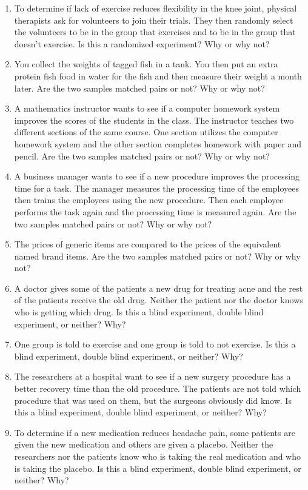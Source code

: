 \documentclass[
]{book}
\begin{document}
\begin{enumerate}
\item
  To determine if lack of exercise reduces flexibility in the knee joint, physical therapists ask for volunteers to join their trials. They then randomly select the volunteers to be in the group that exercises and to be in the group that doesn't exercise. Is this a randomized experiment? Why or why not?
\item
  You collect the weights of tagged fish in a tank. You then put an extra protein fish food in water for the fish and then measure their weight a month later. Are the two samples matched pairs or not? Why or why not?
\item
  A mathematics instructor wants to see if a computer homework system improves the scores of the students in the class. The instructor teaches two different sections of the same course. One section utilizes the computer homework system and the other section completes homework with paper and pencil. Are the two samples matched pairs or not? Why or why not?
\item
  A business manager wants to see if a new procedure improves the processing time for a task. The manager measures the processing time of the employees then trains the employees using the new procedure. Then each employee performs the task again and the processing time is measured again. Are the two samples matched pairs or not? Why or why not?
\item
  The prices of generic items are compared to the prices of the equivalent named brand items. Are the two samples matched pairs or not? Why or why not?
\item
  A doctor gives some of the patients a new drug for treating acne and the rest of the patients receive the old drug. Neither the patient nor the doctor knows who is getting which drug. Is this a blind experiment, double blind experiment, or neither? Why?
\item
  One group is told to exercise and one group is told to not exercise. Is this a blind experiment, double blind experiment, or neither? Why?
\item
  The researchers at a hospital want to see if a new surgery procedure has a better recovery time than the old procedure. The patients are not told which procedure that was used on them, but the surgeons obviously did know. Is this a blind experiment, double blind experiment, or neither? Why?
\item
  To determine if a new medication reduces headache pain, some patients are given the new medication and others are given a placebo. Neither the researchers nor the patients know who is taking the real medication and who is taking the placebo. Is this a blind experiment, double blind experiment, or neither? Why?

\end{enumerate}
\end{document}
